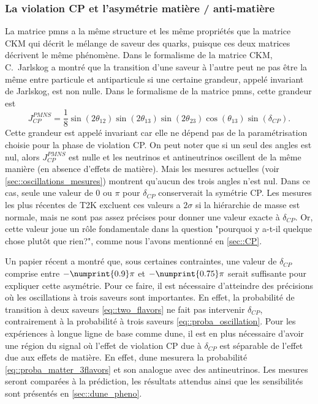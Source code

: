 	        \subsubsection{La violation CP et l'asymétrie matière / anti-matière}\label{sec::CP_violation}
	            La matrice \gls{pmns} a la même structure et les même propriétés que la matrice CKM qui décrit le mélange de saveur des quarks, puisque ces deux matrices décrivent le même phénomène. Dans le formalisme de la matrice CKM, C.~Jarlskog a montré que la transition d'une saveur à l'autre peut ne pas être la même entre particule et antiparticule si une certaine grandeur, appelé invariant de Jarlskog, est non nulle\cite{Jarlskog1985}. Dans le formalisme de la matrice \gls{pmns}, cette grandeur est
	            \begin{equation}
	                J_{CP}^{PMNS}=\frac{1}{8}\sin(2\theta_{12})\sin(2\theta_{13})\sin(2\theta_{23})\cos(\theta_{13})\sin(\delta_{CP}).
	            \end{equation}
	            Cette grandeur est appelé invariant car elle ne dépend pas de la paramétrisation choisie pour la phase de violation CP. On peut noter que si un seul des angles est nul, alors $J_{CP}^{PMNS}$ est nulle et les neutrinos et antineutrinos oscillent de la même manière (en absence d'effets de matière). Mais les mesures actuelles (voir \autoref{sec::oscillations_mesures}) montrent qu'aucun des trois angles n'est nul. Dans ce cas, seule une valeur de $0$ ou $\pi$ pour $\delta_{CP}$ conserverait la symétrie CP. Les mesures les plus récentes de T2K excluent ces valeurs a $2\sigma$\cite{Abe2018} si la hiérarchie de masse est normale, mais ne sont pas assez précises pour donner une valeur exacte à $\delta_{CP}$. Or, cette valeur joue un rôle fondamentale dans la question "pourquoi y a-t-il quelque chose plutôt que rien?", comme nous l'avons mentionné en \autoref{sec::CP}.
	            
	            Un papier récent\cite{Buccella2018}  a montré que, sous certaines contraintes, une valeur de $\delta_{CP}$ comprise entre $-\numprint{0.9}\pi$ et $-\numprint{0.75}\pi$ serait suffisante pour expliquer cette asymétrie. Pour ce faire, il est nécessaire d'atteindre des précisions où les oscillations à trois saveurs sont importantes. En effet, la probabilité de transition à deux saveurs \eqref{eq::two_flavors} ne fait pas intervenir $\delta_{CP}$, contrairement à la probabilité à trois saveurs \eqref{eq::proba_oscillation}. Pour les expériences à longue ligne de base comme \gls{dune}, il est en plus nécessaire d'avoir une région du signal où l'effet de violation CP due à $\delta_{CP}$ est séparable de l'effet due aux effets de matière. En effet,  \gls{dune} mesurera la probabilité \eqref{eq::proba_matter_3flavors} et son analogue avec des antineutrinos. Les mesures seront comparées à la prédiction, les résultats attendus ainsi que les sensibilités sont présentés en \autoref{sec::dune_pheno}.
        
        \printbibliography